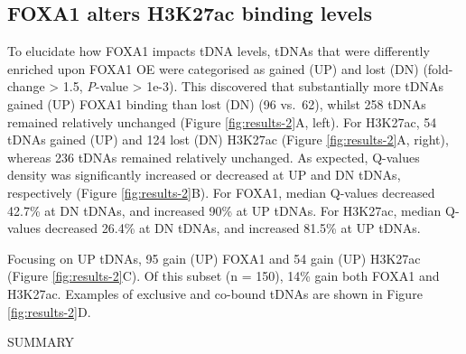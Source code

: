 \documentclass[
  12pt,
]{article}
\begin{document}
\hypertarget{foxa1-alters-h3k27ac-binding-levels}{%
\subsection{FOXA1 alters H3K27ac binding levels}\label{foxa1-alters-h3k27ac-binding-levels}}

To elucidate how FOXA1 impacts tDNA levels, tDNAs that were differently enriched upon FOXA1 OE were categorised as gained (UP) and lost (DN) (fold-change \textgreater{} 1.5, \emph{P}-value \textgreater{} 1e-3).
This discovered that substantially more tDNAs gained (UP) FOXA1 binding than lost (DN) (96 vs.~62), whilst 258 tDNAs remained relatively unchanged (Figure \ref{fig:results-2}A, left).
For H3K27ac, 54 tDNAs gained (UP) and 124 lost (DN) H3K27ac (Figure \ref{fig:results-2}A, right), whereas 236 tDNAs remained relatively unchanged.
As expected, Q-values density was significantly increased or decreased at UP and DN tDNAs, respectively (Figure \ref{fig:results-2}B).
For FOXA1, median Q-values decreased 42.7\% at DN tDNAs, and increased 90\% at UP tDNAs.
For H3K27ac, median Q-values decreased 26.4\% at DN tDNAs, and increased 81.5\% at UP tDNAs.

Focusing on UP tDNAs, 95 gain (UP) FOXA1 and 54 gain (UP) H3K27ac (Figure \ref{fig:results-2}C).
Of this subset (n = 150), 14\% gain both FOXA1 and H3K27ac.
Examples of exclusive and co-bound tDNAs are shown in Figure \ref{fig:results-2}D.

SUMMARY
\end{document}
